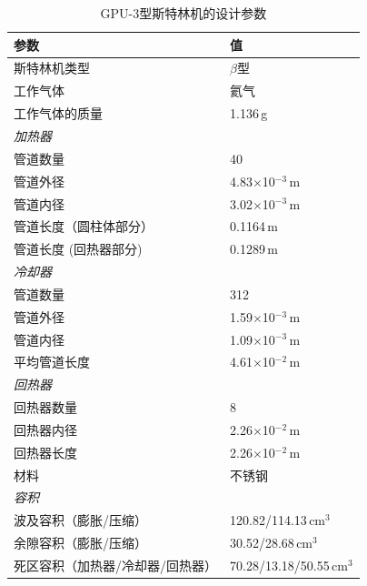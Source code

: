 \begin{table}[t!]\footnotesize
\setlength{\abovecaptionskip}{0pt}
	\caption{GPU-3型斯特林机的设计参数}
	\centering
	\begin{tabular}{ll}
		\toprule
		参数				&	值\\
		\midrule
		斯特林机类型					&	$\beta$型\\
		工作气体			&	氦气\\
		工作气体的质量	&	1.136\,g\\
		\emph{加热器}			&\\
		管道数量		&	40\\
		管道外径	&	4.83$\times$10$^{-3}\,\mathrm{m}$\\
		管道内径	&	3.02$\times$10$^{-3}\,\mathrm{m}$\\
		管道长度（圆柱体部分）		&	0.1164\,m\\
		管道长度 (回热器部分)		&	0.1289\,m\\
		\emph{冷却器}			&\\
		管道数量		&	312\\
		管道外径	&	1.59$\times$10$^{-3}\,\mathrm{m}$\\
		管道内径	&	1.09$\times$10$^{-3}\,\mathrm{m}$\\
		平均管道长度		&	4.61$\times$10$^{-2}\,\mathrm{m}$\\
		\emph{回热器}		&\\
		回热器数量	&	8\\
		回热器内径	&	2.26$\times$10$^{-2}\,\mathrm{m}$\\
		回热器长度		&	2.26$\times$10$^{-2}\,\mathrm{m}$\\
		材料				&	不锈钢\\
		\emph{容积}			&\\
		波及容积（膨胀/压缩）	&	120.82/114.13$\,\mathrm{cm}^3$\\
		余隙容积（膨胀/压缩）	&	30.52/28.68$\,\mathrm{cm}^3$\\
		死区容积（加热器/冷却器/回热器）	&	70.28/13.18/50.55$\,\mathrm{cm}^3$\\
		\bottomrule
	\end{tabular}
	\label{tab:GPU3parameters}
\end{table}

